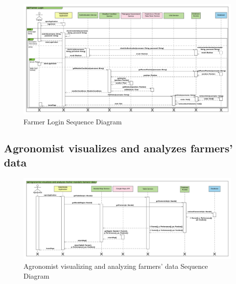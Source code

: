 \newpage
\begin{landscape}
\begin{figure}[h]
\vspace*{-2cm}
\noindent
\centering
\centerline{\includegraphics[scale= 0.108]{./Images/Sequence diagram/Farmer Login Sequence Diagram.png}}
    \caption{Farmer Login Sequence Diagram}
    \vspace*{-12cm}
\end{figure}
\fillandplacepagenumber
\end{landscape}


\subsection{Agronomist visualizes and analyzes farmers' data}

\newpage
\begin{landscape}
\begin{figure}[h]
\vspace*{-2cm}
\noindent
\centering
\centerline{\includegraphics[scale= 0.108]{./Images/Sequence diagram/Agronomist visualizes and analyzes his_her mandal's farmers' data.png}}
    \caption{Agronomist visualizing and analyzing farmers' data Sequence Diagram}
    \vspace*{-12cm}
\end{figure}
\fillandplacepagenumber
\end{landscape}

